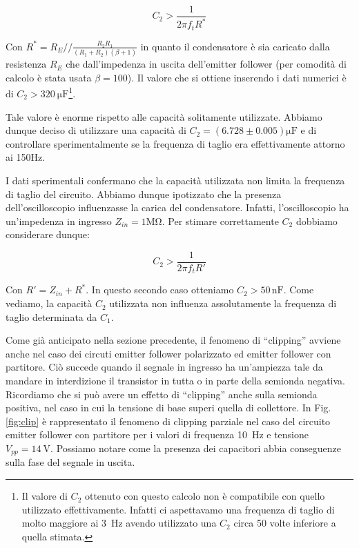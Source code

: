 \begin{equation}
C_2>\frac{1}{2\pi f_t R^*}
\end{equation}

Con $R^*=R_E//\frac{R_2R_1}{(R_1+R_2)(\beta +1)}$ in quanto il condensatore è sia caricato dalla resistenza $R_E$ che dall'impedenza in uscita dell'emitter follower (per comodità di calcolo è stata usata $\beta=100$). Il valore che si ottiene inserendo i dati numerici è di $C_2>\SI{320}{\micro\farad}$\footnote{Il valore di $C_2$ ottenuto con questo calcolo non è compatibile con quello utilizzato effettivamente. Infatti ci aspettavamo una frequenza di taglio di molto maggiore ai \SI{3}{\hertz} avendo utilizzato una $C_2$ circa 50 volte inferiore a quella stimata.}.

Tale valore è enorme rispetto alle capacità solitamente utilizzate. Abbiamo dunque deciso di utilizzare una capacità di $C_2=(6.728 \pm 0.005)\si{\micro\farad}$ e di controllare sperimentalmente se la frequenza di taglio era effettivamente attorno ai 150\si{\hertz}.

I dati sperimentali confermano che la capacità utilizzata non limita la frequenza di taglio del circuito. Abbiamo dunque ipotizzato che la presenza dell'oscilloscopio influenzasse la carica del condensatore. Infatti, l'oscilloscopio ha un'impedenza in ingresso $Z_{in}=1\si{\mega\ohm}$. Per stimare correttamente $C_2$ dobbiamo considerare dunque: 

$$C_2>\frac{1}{2\pi f_t R'}$$

Con $R'=Z_{in}+R^*$. In questo secondo caso otteniamo $C_2>50\,\si{\nano\farad}$.
Come vediamo, la capacità $C_2$ utilizzata non influenza assolutamente la frequenza di taglio determinata da $C_1$. 


Come già anticipato nella sezione precedente, il fenomeno di ``clipping'' avviene anche nel caso dei circuti emitter follower polarizzato ed emitter follower con partitore.
Ciò succede quando il segnale in ingresso ha un'ampiezza tale da mandare in interdizione il transistor in tutta o in parte  della semionda negativa. Ricordiamo che si può avere un effetto di ``clipping'' anche sulla semionda positiva, nel caso in cui la tensione di base superi quella di collettore. 
In Fig. \ref{fig:clip} è rappresentato il fenomeno di clipping parziale nel caso del circuito emitter follower con partitore per i valori di frequenza \SI{10}{\hertz} e tensione $V_{pp} = \SI{14}{\volt}$. Possiamo notare come la presenza dei capacitori abbia conseguenze sulla fase del segnale in uscita.



